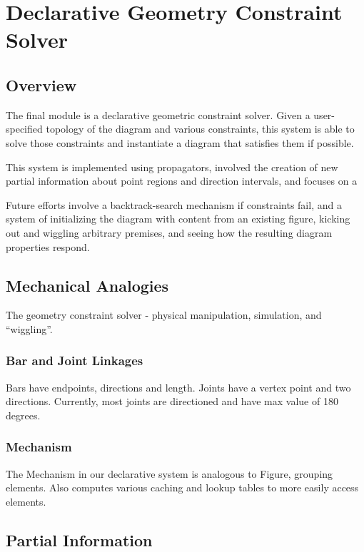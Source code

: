 \chapter{Declarative Geometry Constraint Solver}
\label{chap:declarative}

\section{Overview}

The final module is a declarative geometric constraint solver. Given
a user-specified topology of the diagram and various constraints, this
system is able to solve those constraints and instantiate a diagram
that satisfies them if possible.

This system is implemented using propagators, involved the creation of
new partial information about point regions and direction intervals,
and focuses on a

Future efforts involve a backtrack-search mechanism if constraints
fail, and a system of initializing the diagram with content from an
existing figure, kicking out and wiggling arbitrary premises, and
seeing how the resulting diagram properties respond.

\section{Mechanical Analogies}

The geometry constraint solver - physical manipulation, simulation,
and ``wiggling''.

\subsection{Bar and Joint Linkages}

Bars have endpoints, directions and length. Joints have a vertex point
and two directions. Currently, most joints are directioned and have
max value of 180 degrees.

\subsection{Mechanism}

The Mechanism in our declarative system is analogous to Figure,
grouping elements. Also computes various caching and lookup tables to
more easily access elements.

\section{Partial Information}

